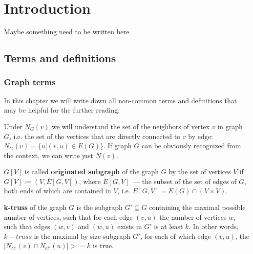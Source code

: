 \documentclass[11pt,a4paper,oneside]{article}
\begin{document}
\renewcommand{\t}[1]{\mbox{\texttt{#1}}}
\newcommand{\s}[1]{\mbox{``\t{#1}''}}
\newcommand{\eps}{\varepsilon}
\renewcommand{\phi}{\varphi}
\newcommand{\plainhat}{{\char 94}}

\newcommand{\Z}{\mathbb{Z}}
\newcommand{\w}[1]{``\t{#1}''}





\chapter{Introduction}

Maybe something need to be written here


\section{Terms and definitions}

\subsection{Graph terms}

In this chapter we will write down all non-common terms and definitions that may be helpful for the further reading.


Under \textbf{$N_G(v)$} we will understand the set of the neighbors of vertex $v$ in graph $G$, i.e. the set of the vertices that are directly connected to $v$ by edge: $N_G(v) = \{u | (v, u) \in E(G)\}$. If graph $G$ can be obviously recognized from the context, we can write just $N(v)$.

\textbf{$G[V]$} is called \textbf{originated subgraph} of the graph $G$ by the set of vertices $V$ if $G[V] := (V, E[G, V])$, where $E[G, V]$~--- the subset of the set of edges of $G$, both ends of which are contained in $V$, i.e. $E[G, V] = E(G) \cap (V \times V)$.

\textbf{k-truss} of the graph $G$ is the subgraph $G' \subseteq G$ containing the maximal possible number of vertices, such that for each edge $(v, u)$ the number of vertices $w$, such that edges $(w, v)$ and $(w, u)$ exists in $G'$ is at least $k$. In other words, $k-truss$ is the maximal by size subgraph $G'$, for each of which edge $(v, u)$, the $|N_{G'}(v) \cap N_{G'}(u)| >= k$ is true.
\end{document}
